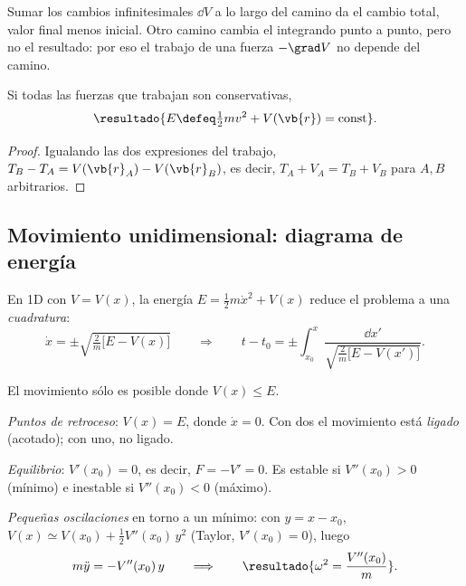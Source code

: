\begin{observacion}
Sumar los cambios infinitesimales $\dd V$ a lo largo del camino da el cambio
total, valor final menos inicial. Otro camino cambia el integrando punto a
punto, pero no el resultado: por eso el trabajo de una fuerza $-\grad V$ no
depende del camino.
\end{observacion}

\begin{teorema}
\label{teo:energia-particula}
Si todas las fuerzas que trabajan son conservativas,
\begin{equation}
  \resultado{E\defeq\tfrac12 m v^{2}+V(\vb{r})=\text{const}} .
\end{equation}
\end{teorema}

\begin{proof}
Igualando las dos expresiones del trabajo,
$T_{B}-T_{A}=V(\vb{r}_{A})-V(\vb{r}_{B})$, es decir, $T_{A}+V_{A}=T_{B}+V_{B}$ para
$A,B$ arbitrarios.
\end{proof}

\subsection{Movimiento unidimensional: diagrama de energía}

En 1D con $V=V(x)$, la energía $E=\tfrac12 m\dot x^{2}+V(x)$ reduce el problema a
una \emph{cuadratura}:
\begin{equation}
  \dot x=\pm\sqrt{\tfrac{2}{m}\bigl[E-V(x)\bigr]}
  \qquad\Longrightarrow\qquad
  t-t_{0}=\pm\int_{x_{0}}^{x}\frac{\dd x'}{\sqrt{\tfrac{2}{m}\bigl[E-V(x')\bigr]}} .
  \label{eq:cuadratura}
\end{equation}

\begin{proposicion}
\label{prop:diagrama}
\begin{casos}
  \item El movimiento sólo es posible donde $V(x)\le E$.
  \item \emph{Puntos de retroceso}: $V(x)=E$, donde $\dot x=0$. Con dos el
        movimiento está \emph{ligado} (acotado); con uno, no ligado.
  \item \emph{Equilibrio}: $V'(x_{0})=0$, es decir, $F=-V'=0$. Es estable si
        $V''(x_{0})>0$ (mínimo) e inestable si $V''(x_{0})<0$ (máximo).
  \item \emph{Pequeñas oscilaciones} en torno a un mínimo: con
        $y=x-x_{0}$, $V(x)\simeq V(x_{0})+\tfrac12V''(x_{0})\,y^{2}$ (Taylor, $V'(x_{0})=0$), luego
        \begin{equation}
          m\ddot y=-V''(x_{0})\,y
          \qquad\Longrightarrow\qquad
          \resultado{\omega^{2}=\frac{V''(x_{0})}{m}} .
          \label{eq:pequenas}
        \end{equation}
\end{casos}
\end{proposicion}


